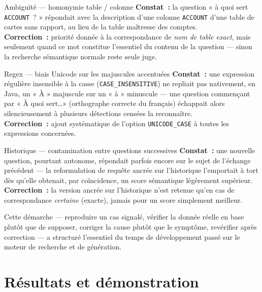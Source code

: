 ﻿\documentclass[12pt,a4paper]{report}
\newcommand{\code}[1]{\texttt{\color{biatbluedk}#1}}
\begin{document}
\begin{bugcard}{Ambiguïté --- homonymie table / colonne}
\textbf{Constat~:} la question « à quoi sert \code{ACCOUNT}~? » répondait avec la description d'une colonne \code{ACCOUNT} d'une table de cartes sans rapport, au lieu de la table maîtresse des comptes.\\[4pt]
\textbf{Correction~:} priorité donnée à la correspondance de \emph{nom de table exact}, mais seulement quand ce mot constitue l'essentiel du contenu de la question --- sinon la recherche sémantique normale reste seule juge.
\end{bugcard}

\begin{bugcard}{Regex --- biais Unicode sur les majuscules accentuées}
\textbf{Constat~:} une expression régulière insensible à la casse (\code{CASE\_INSENSITIVE}) ne repliait pas nativement, en Java, un « À » majuscule sur un « à » minuscule --- une question commençant par « À quoi sert\dots » (orthographe correcte du français) échappait alors silencieusement à plusieurs détections censées la reconnaître.\\[4pt]
\textbf{Correction~:} ajout systématique de l'option \code{UNICODE\_CASE} à toutes les expressions concernées.
\end{bugcard}

\begin{bugcard}{Historique --- contamination entre questions successives}
\textbf{Constat~:} une nouvelle question, pourtant autonome, répondait parfois encore sur le sujet de l'échange précédent --- la reformulation de requête ancrée sur l'historique l'emportait à tort dès qu'elle obtenait, par coïncidence, un score sémantique légèrement supérieur.\\[4pt]
\textbf{Correction~:} la version ancrée sur l'historique n'est retenue qu'en cas de correspondance \emph{certaine} (exacte), jamais pour un score simplement meilleur.
\end{bugcard}

Cette démarche --- reproduire un cas signalé, vérifier la donnée réelle en base plutôt que de supposer, corriger la cause plutôt que le symptôme, revérifier après correction --- a structuré l'essentiel du temps de développement passé sur le moteur de recherche et de génération.

\chapter{Résultats et démonstration}
\label{ch:resultats}
\end{document}
